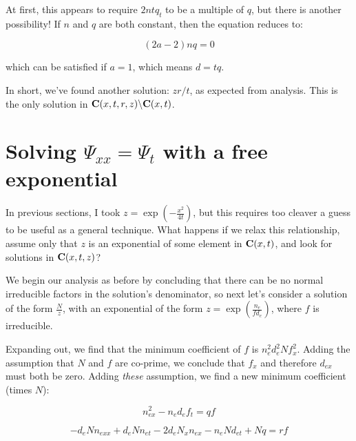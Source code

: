 \documentclass{article}
\newcommand{\C}{\ensuremath{{\bf C}}}
\begin{document}
At first, this appears to require $2ntq_t$ to be a multiple of $q$, but there is another possibility!
If $n$ and $q$ are both constant, then the equation reduces to:

$$(2a-2)nq = 0$$

which can be satisfied if $a=1$, which means $d=tq$.

In short, we've found another solution: $zr/t$, as expected from analysis.
This is the only solution in $\C(x,t,r,z) \backslash \C(x,t)$.

\vfill\eject
\section*{Solving $\Psi_{xx}=\Psi_t$ with a free exponential}

In previous sections, I took $z=\exp(-\frac{x^2}{4t})$, but this
requires too cleaver a guess to be useful as a general technique.
What happens if we relax this relationship, assume only that $z$ is an
exponential of some element in $\C(x,t)$, and look for solutions in
$\C(x,t,z)$?

We begin our analysis as before by concluding that there can be no
normal irreducible factors in the solution's denominator, so next
let's consider a solution of the form $\frac{N}{z}$, with an
exponential of the form $z=\exp(\frac{n_e}{f d_e})$, where $f$ is
irreducible.

Expanding out, we find that the minimum coefficient of $f$ is
$n_e^{2}d_e^{2}Nf_x^{2}$.  Adding the assumption that $N$ and $f$ are
co-prime, we conclude that $f_x$ and therefore $d_{ex}$ must both be
zero.  Adding {\it these} assumption, we find a new minimum
coefficient (times $N$):

\begin{comment}
  This is the calculation assuming only $f_x$, not $d_{ex}$ is zero.

$$-n_ed_e^{3}f_t +d_e^{2}n_{ex}^{2} -2n_ed_en_{ex}d_{ex} +n_e^{2}d_{ex}^{2}$$

$$=  (d_e n_{ex} - d_{ex} n_e)^2  -n_ed_e^{3}f_t $$

$$=  \left[ d_e^2 (\frac{n_e}{d_e})_x \right]^2 -n_ed_e^{3}f_t $$
$$=  d_e^4 \left[ \left[ (\frac{n_e}{d_e})_x \right] ^2 -\frac{n_e}{d_e}f_t \right]$$

\end{comment}

$$ n_{ex}^{2} -n_ed_ef_t = qf$$

$$ -d_eNn_{exx} +d_eNn_{et} -2d_eN_xn_{ex} -n_eNd_{et} + Nq = rf $$
\end{document}

